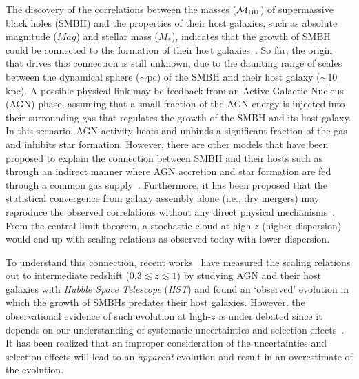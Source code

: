 \documentclass{natureprintstyle}
\newcommand{\mbh}{$\mathcal M_{\rm BH}$}
\newcommand{\mstar}{{$M_*$}}
\begin{document}
The discovery of the correlations between the masses (\mbh) of supermassive black holes (SMBH) and the properties of their host galaxies, such as absolute magnitude ($Mag$) and stellar mass (\mstar), indicates that the growth of SMBH could be connected to the formation of their host galaxies~\cite{Mag++98, F+M00, M+H03, H+R04, Gul++09}. So far, the origin that drives this connection is still unknown, due to the daunting range of scales between the dynamical sphere ($\sim$pc) of the SMBH and their host galaxy ($\sim$10 kpc). A possible physical link may be feedback from an Active Galactic Nucleus (AGN) phase, assuming that a small fraction of the AGN energy is injected into their surrounding gas that regulates the growth of the SMBH and its host galaxy. In this scenario, AGN activity heats and unbinds a significant fraction of the gas and inhibits star formation. However, there are other models that have been proposed to explain the connection between SMBH and their hosts such as through an indirect manner where AGN accretion and star formation are fed through a common gas supply~\cite{Cen2015, Menci2016}. Furthermore, it has been proposed that the statistical convergence from galaxy assembly alone (i.e., dry mergers) may reproduce the observed correlations without any direct physical mechanisms~\cite{Peng2007, Jahnke2011, Hirschmann2010}. From the central limit theorem, a stochastic cloud at high-$z$ (higher dispersion) would end up with scaling relations as observed today with lower dispersion.

To understand this connection, recent works~\cite{Park15, Tre++07, Bennert11, Woo++08} have measured the scaling relations out to intermediate redshift {($0.3\lesssim z \lesssim1$)} by studying AGN and their host galaxies with {\it Hubble Space Telescope} ({\it HST}) and found an `observed' evolution in which the growth of SMBHs predates their host galaxies. However, the observational evidence of such evolution at high-$z$ is under debated since it depends on our understanding of systematic uncertainties and selection effects~\cite{Lauer2007}. It has been realized that an improper consideration of the uncertainties and selection effects will lead to an {\it apparent} evolution and result in an overestimate of the evolution\cite{Volonteri2011}.
\end{document}
